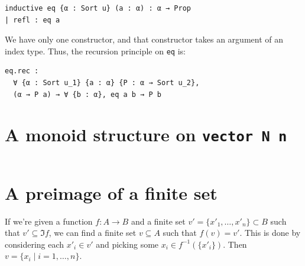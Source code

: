 \documentclass[a4paper, 12pt]{article}
\newcommand{\lean}[1]{\texttt{#1}}
\theoremstyle{changedot}
\theoremstyle{changedotbreak}
\theoremstyle{nonumberplain}
\begin{document}
\begin{verbatim}
inductive eq {α : Sort u} (a : α) : α → Prop
| refl : eq a
\end{verbatim}

We have only one constructor, and that constructor takes an argument of an index type. Thus, the recursion principle on \lean{eq} is:
\begin{verbatim}
eq.rec :
  ∀ {α : Sort u_1} {a : α} {P : α → Sort u_2},
  (α → P a) → ∀ {b : α}, eq a b → P b
\end{verbatim}



\section{A monoid structure on \texttt{vector N n}}\label{lean:vector_add_monoid}
\inputminted{lean}{../src/vector_add_monoid.lean}

\section{A preimage of a finite set}\label{lean:single_preimage}

If we're given a function $f : A \to B$ and a finite set $v' = \{x'_{1}, \dots, x'_{n}\} \subset B$ such that $v' \subseteq \Im f$, we can find a finite set $v \subseteq A$ such that $f(v) = v'$. This is done by considering each $x'_{i} \in v'$ and picking some $x_{i} \in f^{-1}(\{x'_{i}\})$. Then $v = \{x_{i} \mid i = 1, \dots, n\}$.
\end{document}
